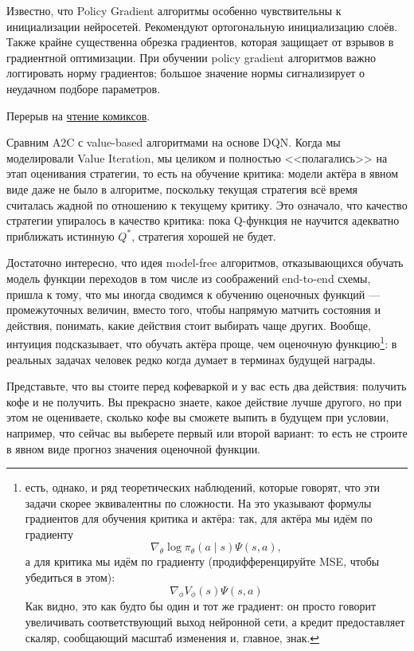 \begin{remark}
Известно, что Policy Gradient алгоритмы особенно чувствительны к инициализации нейросетей. Рекомендуют ортогональную инициализацию слоёв. Также крайне существенна обрезка градиентов, которая защищает от взрывов в градиентной оптимизации. При обучении policy gradient алгоритмов важно логгировать норму градиентов; большое значение нормы сигнализирует о неудачном подборе параметров.
\end{remark}

\begin{example}
Перерыв на \href{https://hackernoon.com/intuitive-rl-intro-to-advantage-actor-critic-a2c-4ff545978752}{чтение комиксов}.
\end{example}

Сравним A2C с value-based алгоритмами на основе DQN. Когда мы моделировали Value Iteration, мы целиком и полностью <<полагались>> на этап оценивания стратегии, то есть на обучение критика: модели актёра в явном виде даже не было в алгоритме, поскольку текущая стратегия всё время считалась жадной по отношению к текущему критику. Это означало, что качество стратегии упиралось в качество критика: пока Q-функция не научится адекватно приближать истинную $Q^*$, стратегия хорошей не будет. 

Достаточно интересно, что идея model-free алгоритмов, отказывающихся обучать модель функции переходов в том числе из соображений end-to-end схемы, пришла к тому, что мы иногда сводимся к обучению оценочных функций --- промежуточных величин, вместо того, чтобы напрямую матчить состояния и действия, понимать, какие действия стоит выбирать чаще других. Вообще, интуиция подсказывает, что обучать актёра проще, чем оценочную функцию\footnote{есть, однако, и ряд теоретических наблюдений, которые говорят, что эти задачи скорее эквивалентны по сложности. На это указывают формулы градиентов для обучения критика и актёра: так, для актёра мы идём по градиенту
$$\nabla_\theta \log \pi_\theta(a \mid s) \Psi(s, a),$$
а для критика мы идём по градиенту (продифференцируйте MSE, чтобы убедиться в этом):
$$\nabla_\phi V_\phi(s) \Psi(s, a)$$
Как видно, это как будто бы один и тот же градиент: он просто говорит увеличивать соответствующий выход нейронной сети, а кредит предоставляет скаляр, сообщающий масштаб изменения и, главное, знак.
}: в реальных задачах человек редко когда думает в терминах будущей награды. 

\begin{example}
Представьте, что вы стоите перед кофеваркой и у вас есть два действия: получить кофе и не получить. Вы прекрасно знаете, какое действие лучше другого, но при этом не оцениваете, сколько кофе вы сможете выпить в будущем при условии, например, что сейчас вы выберете первый или второй вариант: то есть не строите в явном виде прогноз значения оценочной функции.
\end{example}

